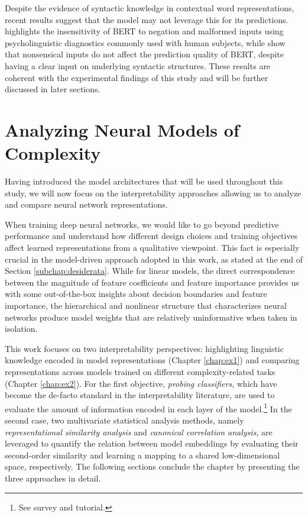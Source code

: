 \documentclass[a4paper, nobind]{templates/ociamthesis}
\begin{document}
Despite the evidence of syntactic knowledge in contextual word representations, recent results suggest that the model may not leverage this for its predictions. \textcite{ettinger-2020-bert} highlights the insensitivity of BERT to negation and malformed inputs using psycholinguistic diagnostics commonly used with human subjects, while \textcite{wallace-etal-2019-nlp} show that nonsensical inputs do not affect the prediction quality of BERT, despite having a clear input on underlying syntactic structures. These results are coherent with the experimental findings of this study and will be further discussed in later sections.

\hypertarget{subchap:analyzing-nlm}{%
\section{Analyzing Neural Models of Complexity}\label{subchap:analyzing-nlm}}

Having introduced the model architectures that will be used throughout this study, we will now focus on the interpretability approaches allowing us to analyze and compare neural network representations.

When training deep neural networks, we would like to go beyond predictive performance and understand how different design choices and training objectives affect learned representations from a qualitative viewpoint. This fact is especially crucial in the model-driven approach adopted in this work, as stated at the end of Section \ref{subchap:desiderata}. While for linear models, the direct correspondence between the magnitude of feature coefficients and feature importance provides us with some out-of-the-box insights about decision boundaries and feature importance, the hierarchical and nonlinear structure that characterizes neural networks produce model weights that are relatively uninformative when taken in isolation.

This work focuses on two interpretability perspectives: highlighting linguistic knowledge encoded in model representations (Chapter \ref{chap:ex1}) and comparing representations across models trained on different complexity-related tasks (Chapter \ref{chap:ex2}). For the first objective, \emph{probing classifiers}, which have become the de-facto standard in the interpretability literature, are used to evaluate the amount of information encoded in each layer of the model.\footnote{See \textcite{belinkov-glass-2019-analysis} survey and \textcite{belinkov-etal-2020-interpretability} tutorial.} In the second case, two multivariate statistical analysis methods, namely \emph{representational similarity analysis} and \emph{canonical correlation analysis}, are leveraged to quantify the relation between model embeddings by evaluating their second-order similarity and learning a mapping to a shared low-dimensional space, respectively. The following sections conclude the chapter by presenting the three approaches in detail.
\end{document}
